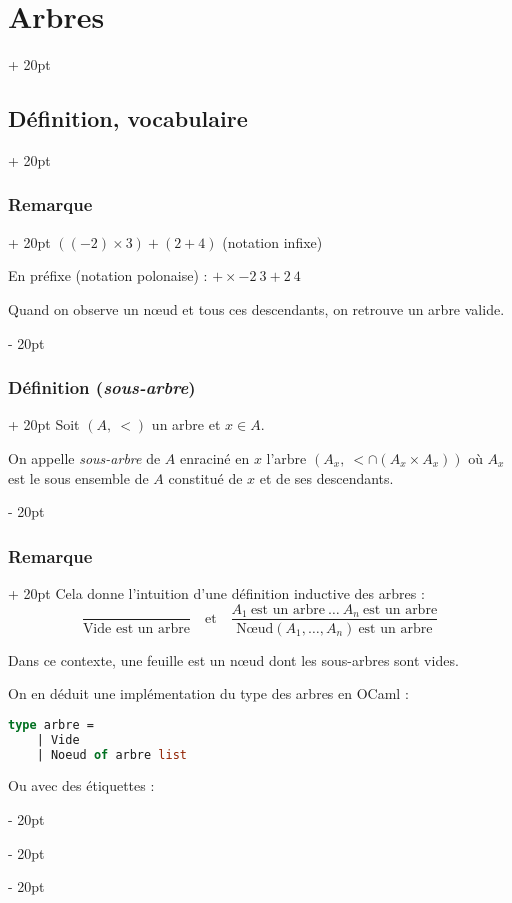 \documentclass[a4paper, 12pt, twoside]{article}
\newcommand{\ind}[1][20pt]{\advance\leftskip + #1}
\newcommand{\deind}[1][20pt]{\advance\leftskip - #1}
\newenvironment{indt}[2][20pt]{#2 \par \ind[#1]}{\par \deind} %
\begin{document}
\begin{indt}{\section{Arbres}}
\begin{indt}{\subsection{Définition, vocabulaire}}
\begin{indt}{\subsubsection{Remarque}}
                $((-2) \times 3) + (2 + 4)$ (notation infixe)
                
                
                En préfixe (notation polonaise) : $+ \times - 2\ 3 + 2\ 4$
                
                Quand on observe un n\oe ud et tous ces descendants, on retrouve un arbre valide.
            \end{indt}
            
            \vspace{12pt}
            
            \begin{indt}{\subsubsection{Définition (\textit{sous-arbre})}}
                Soit $(A,\ <)$ un arbre et $x \in A$.
                
                On appelle \textit{sous-arbre} de $A$ enraciné en $x$ l'arbre $(A_x,\ < \cap (A_x \times A_x))$ où $A_x$ est le sous ensemble de $A$ constitué de $x$ et de ses descendants.
            \end{indt}
            
            \vspace{12pt}
            
            \begin{indt}{\subsubsection{Remarque}}
                \label{1.1.7}
                Cela donne l'intuition d'une définition inductive des arbres :
                    \[ \dfrac{}{\text{Vide est un arbre}} \quad \text{et} \quad \dfrac{A_1\ \text{est un arbre}\ \ldots\ A_n \ \text{est un arbre}}{\text{N\oe ud} (A_1, \ldots, A_n)\ \text{est un arbre}} \]
                
                Dans ce contexte, une feuille est un n\oe ud dont les sous-arbres sont vides.
                
                On en déduit une implémentation du type des arbres en OCaml :
                
                \begin{lstlisting}[language=Caml, xleftmargin=80pt]
type arbre =
    | Vide
    | Noeud of arbre list\end{lstlisting}
                
                Ou avec des étiquettes :
                

\end{indt}
\end{indt}
\end{indt}
\end{document}
